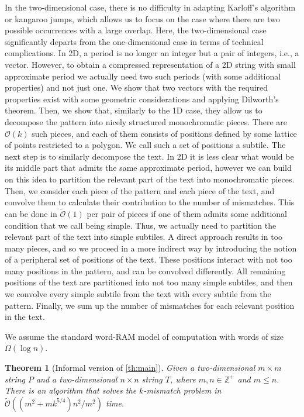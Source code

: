 \documentclass[11pt, letterpaper]{article}
\theoremstyle{plain}
\newtheorem{theorem}{Theorem}
\theoremstyle{definition}
\theoremstyle{remark}
\newcommand{\Z}{\mathbb{Z}}
\renewcommand{\O}{\mathcal{O}}
\newcommand{\tO}{\tilde{\mathcal{O}}}
\begin{document}
In the two-dimensional case, there is no difficulty in adapting Karloff's algorithm or kangaroo jumps, which allows
us to focus on the case where there are two possible occurrences with a large overlap. Here, the two-dimensional
case significantly departs from the one-dimensional case in terms of technical complications. In 2D, a period is
no longer an integer but a pair of integers, i.e., a vector. However, to obtain a compressed representation of
a 2D string with small approximate period we actually need two such periods (with some additional properties) and not
just one. We show that two vectors with the required properties exist with some geometric considerations and
applying Dilworth's theorem. Then, we show that, similarly to the 1D case, they allow us to decompose the pattern
into nicely structured monochromatic pieces. There are $\O(k)$ such pieces, and each of them consists of positions
defined by some lattice of points restricted to a polygon. We call such a set of positions a subtile.
The next step is to similarly decompose the text. In 2D it is less clear what would be its middle part that
admits the same approximate period, however we can build on this idea to partition the relevant part of the text
into monochromatic pieces. Then, we consider each piece of the pattern and each piece of the text,
and convolve them to calculate their contribution to the number of mismatches. This can be done in $\tO(1)$
per pair of pieces if one of them admits some additional condition that we call being simple.
Thus, we actually need to partition the relevant part of the text into simple subtiles. A direct approach
results in too many pieces, and so we proceed in a more indirect way by introducing the notion of
a peripheral set of positions of the text. These positions interact with not too many positions in the pattern,
and can be convolved differently. All remaining positions of the text are partitioned into not too many simple subtiles,
and then we convolve every simple subtile from the text with every subtile from the pattern.
Finally, we sum up the number of mismatches for each relevant position in the text.



We assume the standard word-RAM model of computation with words of size $\Omega(\log n)$.


\begin{theorem}[Informal version of \cref{th:main}]
Given a two-dimensional $m \times m$ string $P$ and a two-dimensional $n \times n$ string $T$, where $m,n \in \Z^+$ and $m \le n$. There is an algorithm that solves the $k$-mismatch problem in $\tO((m^2 + mk^{5/4})n^2 / m^2)$ time.
\end{theorem}
\end{document}
